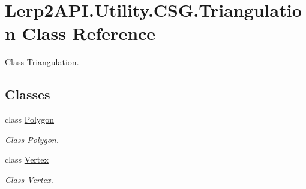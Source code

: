 \hypertarget{class_lerp2_a_p_i_1_1_utility_1_1_c_s_g_1_1_triangulation}{}\section{Lerp2\+A\+P\+I.\+Utility.\+C\+S\+G.\+Triangulation Class Reference}
\label{class_lerp2_a_p_i_1_1_utility_1_1_c_s_g_1_1_triangulation}


Class \hyperlink{class_lerp2_a_p_i_1_1_utility_1_1_c_s_g_1_1_triangulation}{Triangulation}.  


\subsection*{Classes}
\begin{DoxyCompactItemize}
\item 
class \hyperlink{class_lerp2_a_p_i_1_1_utility_1_1_c_s_g_1_1_triangulation_1_1_polygon}{Polygon}
\begin{DoxyCompactList}\small\item\em Class \hyperlink{class_lerp2_a_p_i_1_1_utility_1_1_c_s_g_1_1_triangulation_1_1_polygon}{Polygon}. \end{DoxyCompactList}\item 
class \hyperlink{class_lerp2_a_p_i_1_1_utility_1_1_c_s_g_1_1_triangulation_1_1_vertex}{Vertex}
\begin{DoxyCompactList}\small\item\em Class \hyperlink{class_lerp2_a_p_i_1_1_utility_1_1_c_s_g_1_1_triangulation_1_1_vertex}{Vertex}. \end{DoxyCompactList}\end{DoxyCompactItemize}
